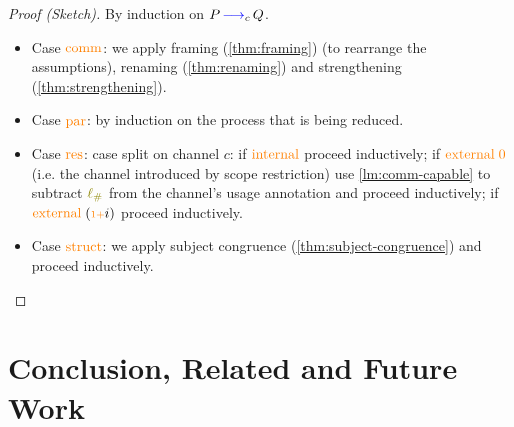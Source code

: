 \documentclass[sigplan,10pt,anonymous,review]{acmart}
\theoremstyle{definition}
\newcommand{\type}[1]{\textcolor{blue}{\operatorname{#1}}}
\newcommand{\constr}[1]{\textcolor{orange}{\operatorname{#1}}}
\newcommand{\func}[1]{\textcolor{olive}{\operatorname{#1}}}
\newcommand{\suc}{\constr{\scriptstyle 1+}}
\newcommand{\lio}{\func{\ell_{\#}}}
\newcommand{\reduce}[1]{\, \type{\longrightarrow}_{#1} \,}
\begin{document}
\begin{proof}[Proof (Sketch)]
  By induction on $P \reduce{c} Q$.
  \hfill{}\\
  \begin{itemize}
    \item
    Case $\constr{comm}$: we apply framing (\autoref{thm:framing}) (to rearrange the assumptions), renaming (\autoref{thm:renaming}) and strengthening (\autoref{thm:strengthening}).
  
    \item
    Case $\constr{par}$: by induction on the process that is being reduced.

    \item
    Case $\constr{res}$: case split on channel $c$:
    if $\constr{internal}$ proceed inductively;
    if $\constr{external}\; \constr{0}$ (i.e. the channel introduced by scope restriction) use \autoref{lm:comm-capable} to subtract $\lio$ from the channel's usage annotation and proceed inductively;
    if $\constr{external}\; (\suc i)$ proceed inductively.

    \item
    Case $\constr{struct}$: we apply subject congruence (\autoref{thm:subject-congruence}) and proceed inductively. \qedhere
  \end{itemize}
\end{proof}

\section{Conclusion, Related and Future Work}
\end{document}

